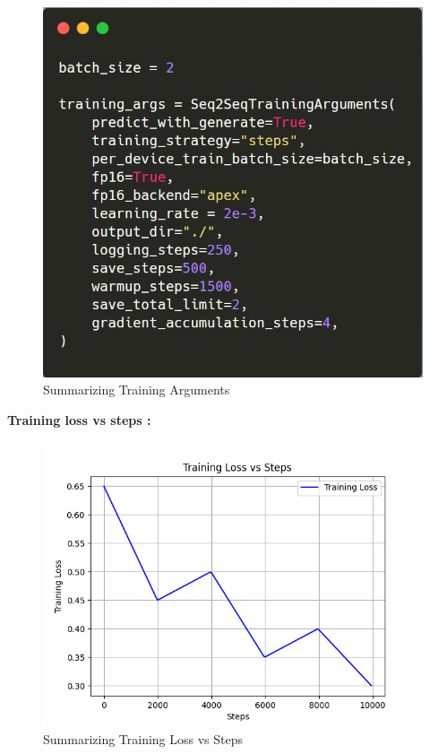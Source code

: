 \begin{figure}[h!]
	\centering
	\includegraphics[scale=0.6]{figures/SummarizationTraining Arguments.png}
	\caption{ Summarizing Training Arguments }
\end{figure}


\newpage

\hfill \break
\textbf{Training loss vs steps :}

\begin{figure}[h!]
	\centering
	\includegraphics[scale=0.8]{figures/Summarization Training Loss vs Steps.png}
	\caption{ Summarizing Training Loss vs Steps }
\end{figure}


